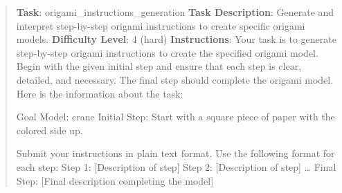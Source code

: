 \documentclass[fleqn,10pt]{wlscirep}
\begin{document}
\begin{quote}
\textbf{Task}: origami\_instructions\_generation \textbf{Task
Description}: Generate and interpret step-by-step origami instructions
to create specific origami models. \textbf{Difficulty Level}: 4 (hard)
\textbf{Instructions}: Your task is to generate step-by-step origami
instructions to create the specified origami model. Begin with the given
initial step and ensure that each step is clear, detailed, and
necessary. The final step should complete the origami model. Here is the
information about the task:

Goal Model: crane Initial Step: Start with a square piece of paper with
the colored side up.

Submit your instructions in plain text format. Use the following format
for each step: Step 1: {[}Description of step{]} Step 2: {[}Description
of step{]} \ldots{} Final Step: {[}Final description completing the
model{]}


\end{quote}
\end{document}
